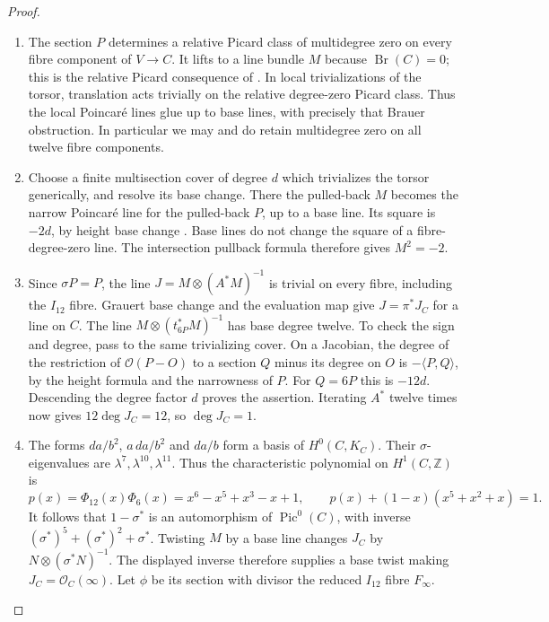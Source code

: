 \begin{proof}
\begin{enumerate}[label=\arabic*.,leftmargin=*]
\item The section $P$ determines a relative
Picard class of multidegree zero on
every fibre component of $V\to C$.
It lifts to a line bundle $M$ because
$\operatorname{Br}(C)=0$; this is the
relative Picard consequence of
\cite[Proposition 0.9.2 and the opening
of Section 4.2, p.370]{CDL24}.
In local trivializations of the torsor,
translation acts trivially on the
relative degree-zero Picard class.
Thus the local Poincar\'e lines glue
up to base lines, with precisely that
Brauer obstruction. In particular we
may and do retain multidegree zero
on all twelve fibre components.

\item Choose a finite multisection cover of
degree $d$ which trivializes the torsor
generically, and resolve its base change.
There the pulled-back $M$ becomes the
narrow Poincar\'e line for the pulled-back
$P$, up to a base line. Its square is
$-2d$, by height base change
\cite[Proposition 8.12, equation (8.25)]{Shioda90}.
Base lines do not change the square
of a fibre-degree-zero line. The
intersection pullback formula therefore
gives $M^2=-2$.

\item Since $\sigma P=P$, the line
$J=M\otimes(A^*M)^{-1}$ is trivial
on every fibre, including the
$I_{12}$ fibre. Grauert base change
and the evaluation map give
$J=\pi^*J_C$ for a line on $C$.
The line $M\otimes(t_{6P}^*M)^{-1}$
has base degree twelve. To check the
sign and degree, pass to the same
trivializing cover. On a Jacobian,
the degree of the restriction of
$\mathcal O(P-O)$ to a section $Q$
minus its degree on $O$ is
$-\langle P,Q\rangle$, by the height
formula and the narrowness of $P$.
For $Q=6P$ this is $-12d$.
Descending the degree factor $d$
proves the assertion. Iterating $A^*$
twelve times now gives
$12\deg J_C=12$, so $\deg J_C=1$.

\item The forms $da/b^2$, $a\,da/b^2$ and
$da/b$ form a basis of $H^0(C,K_C)$.
Their $\sigma$-eigenvalues are
$\lambda^7,\lambda^{10},\lambda^{11}$.
Thus the characteristic polynomial
on $H^1(C,\mathbb Z)$ is
\[
 p(x)=\Phi_{12}(x)\Phi_6(x)
     =x^6-x^5+x^3-x+1,
 \qquad
 p(x)+(1-x)(x^5+x^2+x)=1.
\]
It follows that $1-\sigma^*$ is an
automorphism of $\operatorname{Pic}^0(C)$,
with inverse $(\sigma^*)^5+(\sigma^*)^2+\sigma^*$.
Twisting $M$ by a base line changes
$J_C$ by $N\otimes(\sigma^*N)^{-1}$.
The displayed inverse therefore supplies
a base twist making
$J_C=\mathcal O_C(\infty)$.
Let $\phi$ be its section with divisor
the reduced $I_{12}$ fibre $F_\infty$.


\end{enumerate}
\end{proof}
